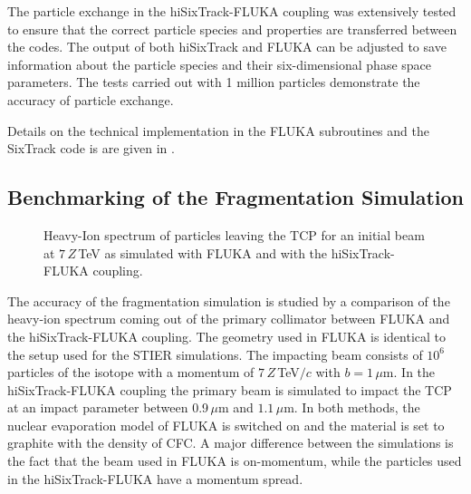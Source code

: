 The particle exchange in the hiSixTrack-FLUKA coupling was extensively tested to ensure that the correct particle species and properties are transferred between the codes. The output of both hiSixTrack and FLUKA can be  adjusted to save information about the particle species and their six-dimensional phase space parameters. The tests carried out with 1 million particles demonstrate the accuracy of particle exchange.

Details on the technical implementation in the FLUKA subroutines and the SixTrack code is are given in \chapref{}.


\subsection{Benchmarking of the Fragmentation Simulation}

\begin{figure}[htbp]
  \centering
  \caption{Heavy-Ion spectrum of particles leaving the TCP for an initial \lead beam at $7\,Z\,$TeV as simulated with FLUKA and with the hiSixTrack-FLUKA coupling. }  
  \label{pic:16072401}
\end{figure}

The accuracy of the fragmentation simulation is studied by a comparison of the heavy-ion spectrum coming out of the primary collimator between FLUKA and the hiSixTrack-FLUKA coupling. The geometry used in FLUKA is identical to the setup used for the STIER simulations. The impacting beam consists of $10^6$ particles of the isotope \lead with a momentum of $7\,Z\,$TeV$/c$ with $b=1\,\mu$m. In the hiSixTrack-FLUKA coupling the primary beam is simulated to impact the TCP at an impact parameter between 0.9$\,\mu$m and $1.1\,\mu$m. In both methods, the nuclear evaporation model of FLUKA is switched on and the material is set to graphite with the density of CFC. A major difference between the simulations is the fact that the beam used in FLUKA is on-momentum, while the particles used in the hiSixTrack-FLUKA have a momentum spread. 

